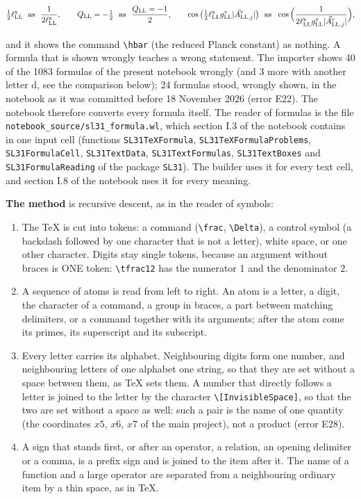 \documentclass[
  10pt,
]{article}
\providecommand{\tightlist}{%
  \setlength{\itemsep}{0pt}\setlength{\parskip}{0pt}}
\begin{document}
\[\tfrac12\ell^{\rm x}_{\rm LL}\ \ \text{as}\ \ \frac{1}{2\ell^{\rm x}_{\rm LL}},\qquad Q_{\rm LL}=-\tfrac12\ \ \text{as}\ \ \frac{Q_{\rm LL}=-1}{2},\qquad \cos\big(\tfrac12\ell^{\rm x}_{\rm LL}g^{\rm v}_{\rm LL}\lvert\vec A^{\rm v}_{{\rm LL},j}\rvert\big)\ \ \text{as}\ \ \cos\Big(\frac{1}{2\ell^{\rm x}_{\rm LL}g^{\rm v}_{\rm LL}\lvert\vec A^{\rm v}_{{\rm LL},j}\rvert}\Big),\]

and it shows the command \texttt{\textbackslash{}hbar} (the reduced
Planck constant) as nothing. A formula that is shown wrongly teaches a
wrong statement. The importer shows 40 of the 1083 formulas of the
present notebook wrongly (and 3 more with another letter d, see the
comparison below); 24 formulas stood, wrongly shown, in the notebook as
it was committed before 18 November 2026 (error E22). The notebook
therefore converts every formula itself. The reader of formulas is the
file \texttt{notebook\_source/sl31\_formula.wl}, which section I.3 of
the notebook contains in one input cell (functions
\texttt{SL31TeXFormula}, \texttt{SL31TeXFormulaProblems},
\texttt{SL31FormulaCell}, \texttt{SL31TextData},
\texttt{SL31TextFormulas}, \texttt{SL31TextBoxes} and
\texttt{SL31FormulaReading} of the package
\texttt{SL31\textasciigrave{}}). The builder uses it for every text
cell, and section I.8 of the notebook uses it for every meaning.

\textbf{The method} is recursive descent, as in the reader of symbols:

\begin{enumerate}
\def\labelenumi{\arabic{enumi}.}
\tightlist
\item
  The TeX is cut into tokens: a command (\texttt{\textbackslash{}frac},
  \texttt{\textbackslash{}Delta}), a control symbol (a backslash
  followed by one character that is not a letter), white space, or one
  other character. Digits stay single tokens, because an argument
  without braces is ONE token: \texttt{\textbackslash{}tfrac12} has the
  numerator 1 and the denominator 2.
\item
  A sequence of atoms is read from left to right. An atom is a letter, a
  digit, the character of a command, a group in braces, a part between
  matching delimiters, or a command together with its arguments; after
  the atom come its primes, its superscript and its subscript.
\item
  Every letter carries its alphabet. Neighbouring digits form one
  number, and neighbouring letters of one alphabet one string, so that
  they are set without a space between them, as TeX sets them. A number
  that directly follows a letter is joined to the letter by the
  character \texttt{\textbackslash{}{[}InvisibleSpace{]}}, so that the
  two are set without a space as well: such a pair is the name of one
  quantity (the coordinates \(x5\), \(x6\), \(x7\) of the main project),
  not a product (error E28).
\item
  A sign that stands first, or after an operator, a relation, an opening
  delimiter or a comma, is a prefix sign and is joined to the item after
  it. The name of a function and a large operator are separated from a
  neighbouring ordinary item by a thin space, as in TeX.
\end{enumerate}
\end{document}
